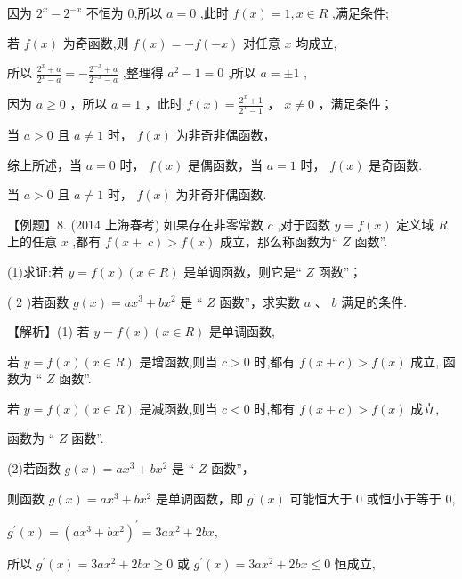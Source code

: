\documentclass[10pt]{article}
\begin{document}
因为 \({2}^{x} - {2}^{-x}\) 不恒为 0,所以 \(a = 0\) ,此时 \(f\left( x\right)  = 1,x \in  R\) ,满足条件;

若 \(f\left( x\right)\) 为奇函数,则 \(f\left( x\right)  =  - f\left( {-x}\right)\) 对任意 \(x\) 均成立,

所以 \(\frac{{2}^{x} + a}{{2}^{x} - a} =  - \frac{{2}^{-x} + a}{{2}^{-x} - a}\) ,整理得 \({a}^{2} - 1 = 0\) ,所以 \(a =  \pm  1\) ,

因为 \(a \geq  0\) ，所以 \(a = 1\) ，此时 \(f\left( x\right)  = \frac{{2}^{x} + 1}{{2}^{x} - 1}\) ， \(x \neq  0\) ，满足条件；

当 \(a > 0\) 且 \(a \neq  1\) 时， \(f\left( x\right)\) 为非奇非偶函数，

综上所述，当 \(a = 0\) 时， \(f\left( x\right)\) 是偶函数，当 \(a = 1\) 时， \(f\left( x\right)\) 是奇函数.

当 \(a > 0\) 且 \(a \neq  1\) 时， \(f\left( x\right)\) 为非奇非偶函数.

【例题】8. (2014 上海春考) 如果存在非零常数 \(c\) ,对于函数 \(y = f\left( x\right)\) 定义域 \(R\) 上的任意 \(x\) ,都有 \(f(x + \; c) > f\left( x\right)\) 成立，那么称函数为“ \(Z\) 函数”.

(1)求证:若 \(y = f\left( x\right) \left( {x \in  R}\right)\) 是单调函数，则它是“ \(Z\) 函数”；

( 2 )若函数 \(g\left( x\right)  = a{x}^{3} + b{x}^{2}\) 是 “ \(Z\) 函数”，求实数 \(a\) 、 \(b\) 满足的条件.

【解析】(1) 若 \(y = f\left( x\right) \left( {x \in  R}\right)\) 是单调函数,

若 \(y = f\left( x\right) \left( {x \in  R}\right)\) 是增函数,则当 \(c > 0\) 时,都有 \(f\left( {x + c}\right)  > f\left( x\right)\) 成立, 函数为 “ \(Z\) 函数”.

若 \(y = f\left( x\right) \left( {x \in  R}\right)\) 是减函数,则当 \(c < 0\) 时,都有 \(f\left( {x + c}\right)  > f\left( x\right)\) 成立,

函数为 “ \(Z\) 函数”.

(2)若函数 \(g\left( x\right)  = a{x}^{3} + b{x}^{2}\) 是 “ \(Z\) 函数”，

则函数 \(g\left( x\right)  = a{x}^{3} + b{x}^{2}\) 是单调函数，即 \({g}^{\prime }\left( x\right)\) 可能恒大于 0 或恒小于等于 0,

\({g}^{\prime }\left( x\right)  = {\left( a{x}^{3} + b{x}^{2}\right) }^{\prime } = {3a}{x}^{2} + {2bx},\)

所以 \({g}^{\prime }\left( x\right)  = {3a}{x}^{2} + {2bx} \geq  0\) 或 \({g}^{\prime }\left( x\right)  = {3a}{x}^{2} + {2bx} \leq  0\) 恒成立,
\end{document}
